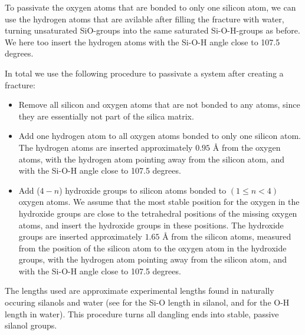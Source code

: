 To passivate the oxygen atoms that are bonded to only one silicon atom, we can use the hydrogen atoms that are avilable after filling the fracture with water, turning unsaturated SiO-groups into the same saturated Si-O-H-groups as before. We here too insert the hydrogen atoms with the Si-O-H angle close to 107.5 degrees.

In total we use the following procedure to passivate a system after creating a fracture:
\begin{itemize}
    \item Remove all silicon and oxygen atoms that are not bonded to any atoms, since they are essentially not part of the silica matrix.
    \item Add one hydrogen atom to all oxygen atoms bonded to only one silicon atom. The hydrogen atoms are inserted approximately $0.95\text{ \AA}$ from the oxygen atoms, with the hydrogen atom pointing away from the silicon atom, and with the Si-O-H angle close to 107.5 degrees.
    \item Add ($4-n$) hydroxide groups to silicon atoms bonded to $(1\leq n<4)$ oxygen atoms. We assume that the most stable position for the oxygen in the hydroxide groups are close to the tetrahedral positions of the missing oxygen atoms, and insert the hydroxide groups in these positions. %
    The hydroxide groups are inserted approximately $1.65\text{ \AA}$ from the silicon atoms, measured from the position of the silicon atom to the oxygen atom in the hydroxide groups, with the hydrogen atom pointing away from the silicon atom, and with the Si-O-H angle close to 107.5 degrees.
\end{itemize}
The lengths used are approximate experimental lengths found in naturally occuring silanols and water (see \cite{lickiss1995synthesis} for the Si-O length in silanol, and \cite{csaszar2005equilibrium} for the O-H length in water). This procedure turns all dangling ends into stable, passive silanol groups.
%
